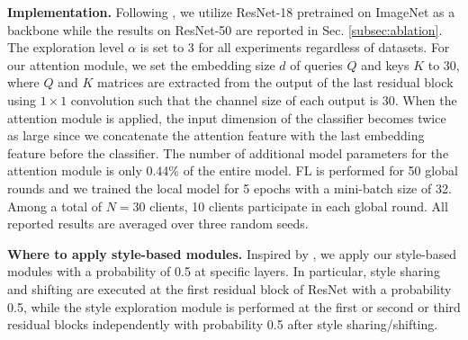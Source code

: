 \documentclass{article}
\theoremstyle{plain}
\theoremstyle{definition}
\theoremstyle{remark}
\begin{document}
\textbf{Implementation.} Following \cite{zhou2021domain}, we utilize ResNet-18 pretrained on ImageNet as a backbone while the results on ResNet-50 are reported in Sec. \ref{subsec:ablation}.  The exploration level $\alpha$ is set to 3 for all experiments regardless of datasets. For our attention module, we set the embedding size $d$ of queries $Q$ and keys $K$ to 30, where   $Q$ and $K$ matrices are extracted from the output of the last residual block using $1\times1$ convolution such that the channel size of each output is 30. When the attention module is applied, the input dimension of the classifier becomes twice as large since we concatenate the attention feature with the last embedding feature before the classifier. The number of additional model parameters for the attention module is only 0.44\% of the entire model.  FL  is performed for 50 global rounds   and we trained the local model for 5 epochs with a mini-batch size of 32. Among a total of $N=30$ clients, 10 clients participate in each global round. All reported results are averaged over three random seeds. 


 \textbf{Where to apply style-based modules.} Inspired by \cite{zhou2021domain, li2022uncertainty}, we apply our style-based modules with a  probability of 0.5 at specific layers. In particular, style sharing and shifting are executed at the first residual block of ResNet  with a probability 0.5, while the style exploration module is performed at the first or second or third residual blocks independently with  probability 0.5 after   style sharing/shifting. %
\end{document}
